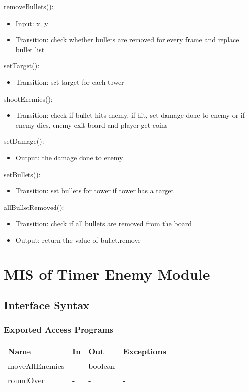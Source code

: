 \documentclass[12,english]{article}
\begin{document}
\noindent removeBullets():
\begin{itemize}
    \item Input: x, y
    \item Transition: check whether bullets are removed for every frame and replace bullet list
\end{itemize}

\noindent setTarget():
\begin{itemize}
    \item Transition: set target for each tower
\end{itemize}

\noindent shootEnemies():
\begin{itemize}
    \item Transition: check if bullet hits enemy, if hit, set damage done to enemy or if enemy dies, enemy exit board and player get coins
\end{itemize}

\noindent setDamage():
\begin{itemize}
    \item Output: the damage done to enemy
\end{itemize}

\noindent setBullets():
\begin{itemize}
    \item Transition: set bullets for tower if tower has a target
\end{itemize}

\noindent allBulletRemoved():
\begin{itemize}
    \item Transition: check if all bullets are removed from the board
    \item Output: return the value of bullet.remove
\end{itemize}


\section{MIS of Timer Enemy Module}
\subsection{Interface Syntax}
\subsubsection{Exported Access Programs}
\begin{table}[h!]
    \centering
    \begin{tabular}{|p{4cm}|p{2cm}|p{2cm}|p{2cm}|}
    \hline
    \textbf {Name}  & {In} & {Out} & {Exceptions} \\
    \hline
    moveAllEnemies & - & boolean & -\\
    \hline
    roundOver & - & - & - \\
    \hline 
    \end{tabular}
\end{table}
\end{document}
